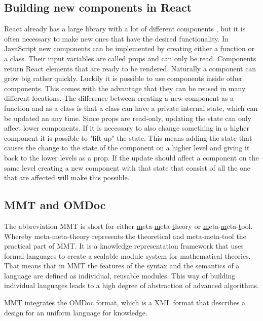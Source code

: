 \documentclass[11pt,a4paper]{article}
\begin{document}
\subsection{Building new components in React}
React already has a large library  with a lot of different components , but it is often necessary to make new ones that have the desired functionality.
In JavaScript new components can be implemented by creating either a function or a class.
Their input variables are called props and can only be read.
Components return React elements that are ready to be rendered. 
Naturally a component can grow big rather quickly.
Luckily it is possible to use components inside other components.
This comes with the advantage that they can be reused in many different locations.
The difference between creating a new component as a function and as a class is that a class can have a private internal state, which can be updated an any time. 
Since props are read-only, updating the state can only affect lower components.
If it is necessary to also change something in a higher component it is possible to "lift up" the state.
This means adding the state that causes the change to the state of the component on a higher level and giving it back to the lower levels as a prop.
If the update should affect a component on the same level creating a new component with that state that consist of all the one that are affected will  make this possible.
\cite{reactjsGS}

\subsection{MMT and OMDoc}
The abbreviation MMT is short for either \underline{m}eta-\underline{m}eta-\underline{t}heory or \underline{m}eta-\underline{m}eta-\underline{t}ool.
Whereby meta-meta-theory represents the theoretical and meta-meta-tool the practical part of MMT.
It is a knowledge representation framework that uses formal  languages to create a scalable module system for mathematical theories.
That means that in MMT the features of the syntax and the semantics of a language are defined as individual, reusable modules.
This way of building individual languages leads to a high degree of abstraction of advanced algorithms.

MMT integrates  the OMDoc format, which is a XML format  that describes a design for an uniform language for knowledge.
\end{document}
